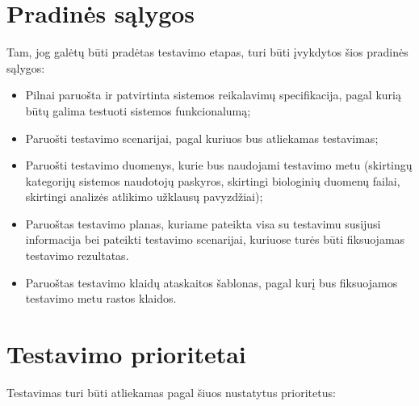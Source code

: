 \documentclass[12pt]{article}
\begin{document}
\newpage

\section{Pradinės sąlygos}
Tam, jog galėtų būti pradėtas testavimo etapas, turi būti įvykdytos šios
pradinės sąlygos:

\begin{itemize}
    \item Pilnai paruošta ir patvirtinta sistemos reikalavimų specifikacija,
    pagal kurią būtų galima testuoti sistemos funkcionalumą;
    \item Paruošti testavimo scenarijai, pagal kuriuos bus atliekamas
    testavimas;
    \item Paruošti testavimo duomenys, kurie bus naudojami testavimo metu
    (skirtingų kategorijų sistemos naudotojų paskyros, skirtingi biologinių
    duomenų failai, skirtingi analizės atlikimo užklausų pavyzdžiai);
    \item Paruoštas testavimo planas, kuriame pateikta visa su testavimu
    susijusi informacija bei pateikti testavimo scenarijai, kuriuose turės būti
    fiksuojamas testavimo rezultatas.
    \item Paruoštas testavimo klaidų ataskaitos šablonas, pagal kurį bus
    fiksuojamos testavimo metu rastos klaidos.
\end{itemize}

\newpage

\section{Testavimo prioritetai}
Testavimas turi būti atliekamas pagal šiuos nustatytus prioritetus:
\end{document}
